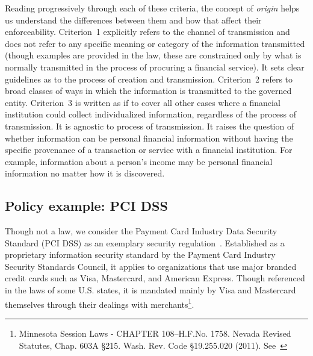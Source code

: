 \documentclass[../thesis.tex]{subfiles}
\begin{document}
Reading progressively through each of these
criteria, the concept of \emph{origin} 
helps us understand the differences between
them and how that affect their enforceability.
Criterion~1 explicitly refers to the channel
of transmission and does not refer 
to any specific meaning or category of
the information transmitted 
(though examples are provided in the law, these are
constrained only by what is normally 
transmitted in the process of
procuring a financial service).
It sets clear guidelines as to the
process of creation and transmission.
Criterion~2 refers to broad classes of
ways in which the information is transmitted 
to the governed entity.
Criterion~3 is written as if to cover all other 
cases where a financial institution could 
collect individualized information, 
regardless of the process of transmission. 
It is agnostic to process of transmission. 
It raises the question of whether information can be
personal financial information without having the specific
provenance of a transaction or service with a
financial institution.
For example, information about a person's income may be
personal financial information no matter how it is discovered.

%

\subsection{Policy example: PCI DSS}
\label{sec:pci-dss}

Though not a law, we consider the Payment Card Industry 
Data Security Standard (PCI DSS) as an exemplary 
security regulation~\cite{bradleypayment}.
Established as a proprietary information security standard 
by the Payment Card Industry Security Standards Council, 
it applies to organizations that use
major branded credit cards such as Visa, Mastercard, 
and American Express.
Though referenced in the laws of some U.S. states, it is 
mandated mainly by Visa and Mastercard themselves through 
their dealings with 
merchants\footnote{Minnesota Session Laws - 
CHAPTER 108--H.F.No. 1758. Nevada Revised Statutes, Chap. 
603A \S 215. Wash. Rev. Code \S 19.255.020 (2011). 
See~\cite{pcisecuritystandardscouncilFAQ}}.
\end{document}
